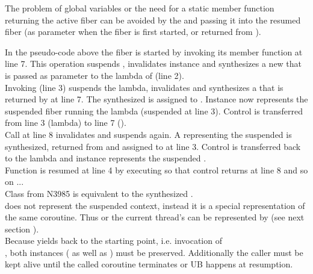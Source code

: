 \label{solution_gpub}


\label{synthesizing}
The problem of global variables or the need for a static member function
returning the active fiber can be avoided by  the
 and passing it into the resumed fiber (as parameter when the
fiber is first started, or returned from \resume).

In the pseudo-code above the fiber  is started by invoking its member
function \resume at line 7. This operation suspends , invalidates
instance  and synthesizes a new \fiber\xspace {} that is passed as parameter
to the lambda of  (line 2).\\
Invoking  (line 3) suspends the lambda, invalidates  and
synthesizes a \fiber that is returned by  at line 7. The
synthesized \fiber is assigned to . Instance  now represents the
suspended fiber running the lambda (suspended at line 3). Control is
transferred from line 3 (lambda) to line 7 ().\\
Call  at line 8 invalidates  and suspends 
again. A \fiber representing the suspended  is synthesized, returned
from  and assigned to  at line 3. Control
is transferred back to the lambda and instance  represents the suspended
.\\
Function  is resumed at line 4 by executing  so that
control returns at line 8 and so on ...\\

Class  from N3985\cite{N3985} is
 equivalent to the synthesized \fiber.\\
 does not represent the suspended context,
instead it is a special representation of the same coroutine. Thus \main or
the current thread's \entryfn\xspace can  be represented by 
(see next section ).\\
Because  yields back to the starting
point, i.e. invocation of\\
,
both instances ( as well as ) must be preserved.
Additionally the caller must be kept alive until the called coroutine terminates
or UB happens at resumption.\\

